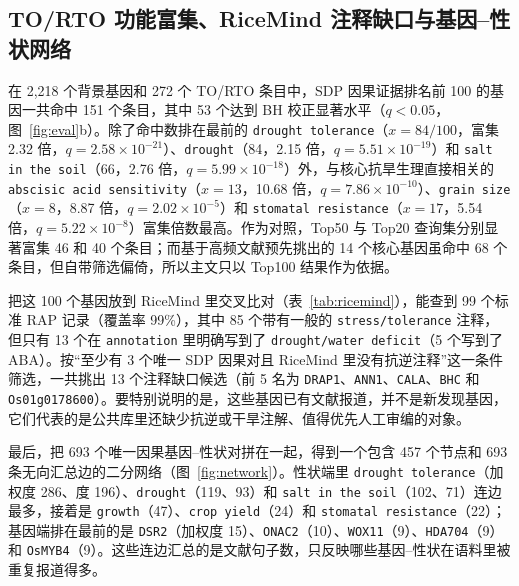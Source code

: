 \documentclass[conference]{IEEEtran}
\begin{document}
\subsection{TO/RTO 功能富集、RiceMind 注释缺口与基因--性状网络}
在 2,218 个背景基因和 272 个 TO/RTO 条目中，SDP 因果证据排名前 100 的基因一共命中 151 个条目，其中 53 个达到 BH 校正显著水平（$q<0.05$，图~\ref{fig:eval}b）。除了命中数排在最前的 \texttt{drought tolerance}（$x=84/100$，富集 2.32 倍，$q=2.58\times 10^{-21}$）、\texttt{drought}（84，2.15 倍，$q=5.51\times 10^{-19}$）和 \texttt{salt in the soil}（66，2.76 倍，$q=5.99\times 10^{-18}$）外，与核心抗旱生理直接相关的 \texttt{abscisic acid sensitivity}（$x=13$，10.68 倍，$q=7.86\times 10^{-10}$）、\texttt{grain size}（$x=8$，8.87 倍，$q=2.02\times 10^{-5}$）和 \texttt{stomatal resistance}（$x=17$，5.54 倍，$q=5.22\times 10^{-8}$）富集倍数最高。作为对照，Top50 与 Top20 查询集分别显著富集 46 和 40 个条目；而基于高频文献预先挑出的 14 个核心基因虽命中 68 个条目，但自带筛选偏倚，所以主文只以 Top100 结果作为依据。

把这 100 个基因放到 RiceMind 里交叉比对（表~\ref{tab:ricemind}），能查到 99 个标准 RAP 记录（覆盖率 99\%），其中 85 个带有一般的 \texttt{stress/tolerance} 注释，但只有 13 个在 \texttt{annotation} 里明确写到了 \texttt{drought/water deficit}（5 个写到了 ABA）。按“至少有 3 个唯一 SDP 因果对且 RiceMind 里没有抗逆注释”这一条件筛选，一共挑出 13 个注释缺口候选（前 5 名为 \texttt{DRAP1}、\texttt{ANN1}、\texttt{CALA}、\texttt{BHC} 和 \texttt{Os01g0178600}）。要特别说明的是，这些基因已有文献报道，并不是新发现基因，它们代表的是公共库里还缺少抗逆或干旱注解、值得优先人工审编的对象。

最后，把 693 个唯一因果基因--性状对拼在一起，得到一个包含 457 个节点和 693 条无向汇总边的二分网络（图~\ref{fig:network}）。性状端里 \texttt{drought tolerance}（加权度 286、度 196）、\texttt{drought}（119、93）和 \texttt{salt in the soil}（102、71）连边最多，接着是 \texttt{growth}（47）、\texttt{crop yield}（24）和 \texttt{stomatal resistance}（22）；基因端排在最前的是 \texttt{DSR2}（加权度 15）、\texttt{ONAC2}（10）、\texttt{WOX11}（9）、\texttt{HDA704}（9）和 \texttt{OsMYB4}（9）。这些连边汇总的是文献句子数，只反映哪些基因--性状在语料里被重复报道得多。
\end{document}

